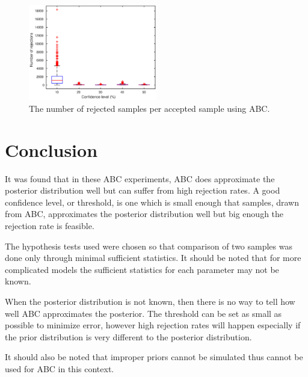 \documentclass[a4paper]{proc}
\begin{document}
\begin{figure}
\includegraphics[width=0.5\textwidth]{rejections.eps}
\caption{The number of rejected samples per accepted sample using ABC.}
\label{rejections}
\end{figure}

\section{Conclusion}
It was found that in these ABC experiments, ABC does approximate the posterior distribution well but can suffer from high rejection rates. A good confidence level, or threshold, is one which is small enough that samples, drawn from ABC, approximates the posterior distribution well but big enough the rejection rate is feasible.

The hypothesis tests used were chosen so that comparison of two samples was done only through minimal sufficient statistics. It should be noted that for more complicated models the sufficient statistics for each parameter may not be known.

When the posterior distribution is not known, then there is no way to tell how well ABC approximates the posterior. The threshold can be set as small as possible to minimize error, however high rejection rates will happen especially if the prior distribution is very different to the posterior distribution.

It should also be noted that improper priors cannot be simulated thus cannot be used for ABC in this context.
\end{document}
